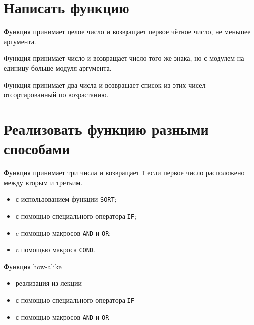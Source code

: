 
\section{Написать функцию}

\problem Функция принимает целое число и возвращает первое чётное число, не меньшее аргумента.



\problem Функция принимает число и возвращает число того же знака, но с модулем на единицу больше модуля аргумента.



\problem Функция принимает два числа и возвращает список из этих чисел отсортированный по возрастанию.




\section {Реализовать функцию разными способами}


\problem Функция принимает три числа и возвращает \verb|T| если первое число расположено между вторым и третьим.\\

\begin{itemize}
	\item с использованием функции \verb|SORT|;
	
	\item с помощью специального оператора \verb|IF|;
	
	\newpage
	\item c помощью макросов \verb|AND| и \verb|OR|;
	
	\item c помощью макроса \verb|COND|.
\end{itemize}


\problem Функция how-alike

\begin{itemize}
	\item реализация из лекции 
	
	\item с помощью специального оператора \verb|IF|
	
	\item с помощью макросов \verb|AND| и \verb|OR|
\end{itemize}

